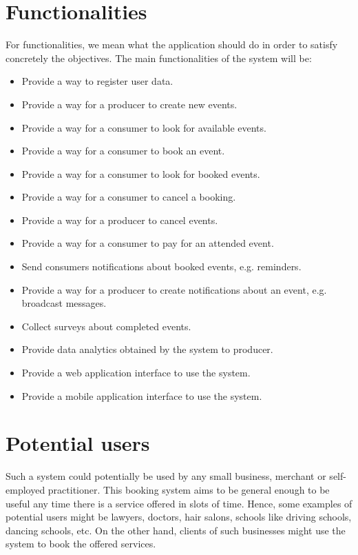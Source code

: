 \documentclass{article}
\begin{document}
\section{Functionalities}
For functionalities, we mean what the application should do in order to satisfy concretely the objectives. The main functionalities of the system will be:
\begin{itemize}
    \item Provide a way to register user data.
    \item Provide a way for a producer to create new events.
    \item Provide a way for a consumer to look for available events.
    \item Provide a way for a consumer to book an event.
    \item Provide a way for a consumer to look for booked events.
    \item Provide a way for a consumer to cancel a booking.
    \item Provide a way for a producer to cancel events.
    \item Provide a way for a consumer to pay for an attended event.
    \item Send consumers notifications about booked events, e.g. reminders.
    \item Provide a way for a producer to create notifications about an event, e.g. broadcast messages.
    \item Collect surveys about completed events.
    \item Provide data analytics obtained by the system to producer.
    \item Provide a web application interface to use the system.
    \item Provide a mobile application interface to use the system.
\end{itemize}

\section{Potential users}
Such a system could potentially be used by any small business, merchant or
self-employed practitioner. This booking system aims to be general enough to be
useful any time there is a service offered in slots of time. Hence, some 
examples of potential users might be lawyers, doctors, hair salons, schools like driving schools, dancing schools, etc. On the other hand, clients of such businesses might use the system to book the offered services.
\end{document}
